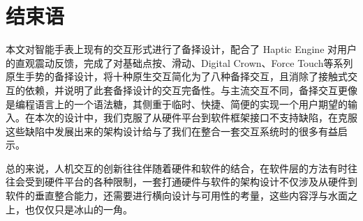 \section{结束语}

本文对智能手表上现有的交互形式进行了备择设计，配合了 Haptic Engine 对用户的直观震动反馈，完成了对基础点按、滑动、Digital Crown、Force Touch等系列原生手势的备择设计，将十种原生交互简化为了八种备择交互，且消除了接触式交互的依赖，并说明了此套备择设计的交互完备性。与主流交互不同，备择交互更像是编程语言上的一个语法糖，其侧重于临时、快捷、简便的实现一个用户期望的输入。在本次的设计中，我们克服了从硬件平台到软件框架接口不支持缺陷，在克服这些缺陷中发展出来的架构设计给与了我们在整合一套交互系统时的很多有益启示。

总的来说，人机交互的创新往往伴随着硬件和软件的结合，在软件层的方法有时往往会受到硬件平台的各种限制，一套打通硬件与软件的架构设计不仅涉及从硬件到软件的垂直整合能力，还需要进行横向设计与可用性的考量，这些内容浮与水面之上，也仅仅只是冰山的一角。

\cleardoublepage
